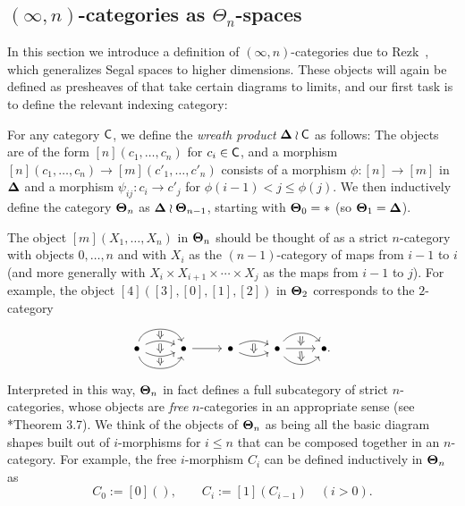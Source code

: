 \documentclass[a4paper,11pt]{article}
\begin{document}
\subsection{$(\infty,n)$-categories as
  $\Theta_n$-spaces}\label{subsec:thetan}
In this section we introduce a definition of $(\infty,n)$-categories
due to Rezk~\cite{RezkThetan}, which generalizes Segal spaces to
higher dimensions. These objects will again be defined as presheaves of
\igpds{} that take certain diagrams to limits, and our first task is
to define the relevant indexing category:
\begin{defn}\label{def:wreath}
  For any category $\textup{\textsf{C}}$, we define the \emph{wreath product}
  $\boldsymbol{\Delta} \wr \textup{\textsf{C}}$ as follows: The objects are of the form
  $[n](c_{1},\ldots,c_{n})$ for $c_{i} \in \textup{\textsf{C}}$, and a morphism
  $[n](c_{1},\ldots,c_{n}) \to [m](c'_{1},\ldots,c'_{n})$ consists of
  a morphism $\phi \colon [n] \to [m]$ in $\boldsymbol{\Delta}$ and a morphism
  $\psi_{ij} \colon c_{i} \to c'_{j}$ for $\phi(i-1)< j \leq \phi(j)$.
  We then inductively define the category $\boldsymbol{\Theta}_{n}$ as
  $\boldsymbol{\Delta} \wr \boldsymbol{\Theta}_{n-1}$, starting with $\boldsymbol{\Theta}_{0} = *$ (so
  $\boldsymbol{\Theta}_{1} = \boldsymbol{\Delta}$).
\end{defn}

\begin{remark}
  The object $[m](X_{1},\ldots,X_{n})$ in $\boldsymbol{\Theta}_{n}$ should be thought
  of as a strict $n$-category with objects $0,\ldots,n$ and with
  $X_{i}$ as the $(n-1)$-category of maps from $i-1$ to $i$ (and more
  generally with $X_{i} \times X_{i+1} \times \cdots \times X_{j}$ as
  the maps from $i-1$ to $j$). For example, the object
  $[4]([3],[0],[1],[2])$ in $\boldsymbol{\Theta}_{2}$ corresponds to 
  the $2$-category
\[
\begin{tikzcd}
  \bullet 
  \ar[r, bend left=75, ""{below,name=A,inner sep=0.5pt}] 
  \ar[r, bend left=25, ""{name=B1,inner sep=0.5pt},
  ""{name=B2,below,inner sep=1pt}] 
  \ar[r, bend right=25, ""{name=C1,inner sep=1pt}, ""{below,name=C2,inner sep=0.5pt}] 
  \ar[r, bend right=75, ""{name=D,inner sep=1pt}] &
  \bullet 
  \ar[r]  &
  \bullet 
  \ar[r, bend left=25, ""{below,name=E,inner sep=1pt}] 
  \ar[r, bend right=25, ""{name=F,inner sep=1pt}] &
  \bullet 
  \ar[r, bend left=50, ""{below,name=G,inner sep=1pt}] 
  \ar[r, ""{name=H1,inner sep=1pt}, ""{name=H2,below,inner sep=1pt}] 
  \ar[r, bend right=50, ""{name=I,inner sep=1pt}] &
  \bullet.
  \arrow[from=A,to=B1,Rightarrow]
  \arrow[from=B2,to=C1,Rightarrow]
  \arrow[from=C2,to=D,Rightarrow]
  \arrow[from=E,to=F,Rightarrow]
  \arrow[from=G,to=H1,Rightarrow]
  \arrow[from=H2,to=I,Rightarrow]
\end{tikzcd}
\]  
Interpreted in this way, $\boldsymbol{\Theta}_{n}$ in fact defines a full subcategory
of strict $n$-categories, whose objects are \emph{free} $n$-categories
in an appropriate sense (see \cite{BergerWreath}*{Theorem 3.7}). We
think of the objects of $\boldsymbol{\Theta}_{n}$ as being all the basic diagram shapes
built out of $i$-morphisms for $i \leq n$ that can be composed
together in an $n$-category. For example, the free $i$-morphism
$C_{i}$ can be defined inductively in $\boldsymbol{\Theta}_{n}$ as
\[ C_{0} := [0](), \qquad C_{i} := [1](C_{i-1})\quad(i>0).\]
\end{remark}
\end{document}
